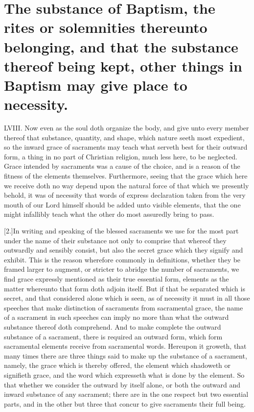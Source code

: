 \section*{The substance of Baptism, the rites or solemnities thereunto belonging, and that the substance thereof being kept, other things in Baptism may give place to necessity.}
LVIII. Now even as the soul doth organize the body, and give unto every member thereof that substance, quantity, and shape, which nature seeth most expedient, so the inward grace of sacraments may teach what serveth best for their outward form, a thing in no part of Christian religion, much less here, to be neglected. Grace intended by sacraments was a cause of the choice, and is a reason of the fitness of the elements themselves. Furthermore, seeing that the grace which here we receive doth no way depend upon the natural force of that which we presently behold, it was of necessity that words of express declaration taken from the very mouth of our Lord himself should be added unto visible elements, that the one might infallibly teach what the other do most assuredly bring to pass.

[2.]In writing and speaking of the blessed sacraments we use for the most part under the name of their substance not only to comprise that whereof they outwardly and sensibly consist, but also the secret grace which they signify and  exhibit.
 This is the reason wherefore commonly in definitions, whether they be framed larger to augment, or stricter to abridge the number of sacraments, we find grace expressly mentioned as their true essential form, elements as the matter whereunto that form doth adjoin itself. But if that be separated which is secret, and that considered alone which is seen, as of necessity it must in all those speeches that make distinction of sacraments from sacramental grace, the name of a sacrament in such speeches can imply no more than what the outward substance thereof doth comprehend. And to make complete the outward substance of a sacrament, there is required an outward form, which form sacramental elements receive from sacramental words. Hereupon it groweth, that many times there are three things said to make up the substance of a sacrament, namely, the grace which is thereby offered, the element which shadoweth or signifieth grace, and the word which expresseth what is done by the element. So that whether we consider the outward by itself alone, or both the outward and inward substance of any sacrament; there are in the one respect but two essential parts, and in the other but three that concur to give sacraments their full being.

